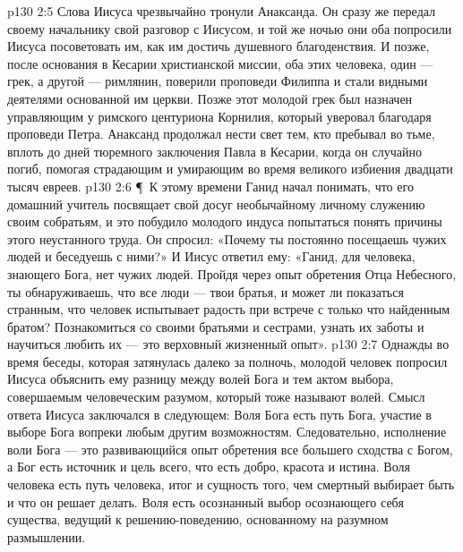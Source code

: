\vs p130 2:5 Слова Иисуса чрезвычайно тронули Анаксанда. Он сразу же передал своему начальнику свой разговор с Иисусом, и той же ночью они оба попросили Иисуса посоветовать им, как им достичь душевного благоденствия. И позже, после основания в Кесарии христианской миссии, оба этих человека, один --- грек, а другой --- римлянин, поверили проповеди Филиппа и стали видными деятелями основанной им церкви. Позже этот молодой грек был назначен управляющим у римского центуриона Корнилия, который уверовал благодаря проповеди Петра. Анаксанд продолжал нести свет тем, кто пребывал во тьме, вплоть до дней тюремного заключения Павла в Кесарии, когда он случайно погиб, помогая страдающим и умирающим во время великого избиения двадцати тысяч евреев.
\vs p130 2:6 \P\ К этому времени Ганид начал понимать, что его домашний учитель посвящает свой досуг необычайному личному служению своим собратьям, и это побудило молодого индуса попытаться понять причины этого неустанного труда. Он спросил: «Почему ты постоянно посещаешь чужих людей и беседуешь с ними?» И Иисус ответил ему: «Ганид, для человека, знающего Бога, нет чужих людей. Пройдя через опыт обретения Отца Небесного, ты обнаруживаешь, что все люди --- твои братья, и может ли показаться странным, что человек испытывает радость при встрече с только что найденным братом? Познакомиться со своими братьями и сестрами, узнать их заботы и научиться любить их --- это верховный жизненный опыт».
\vs p130 2:7 Однажды во время беседы, которая затянулась далеко за полночь, молодой человек попросил Иисуса объяснить ему разницу между волей Бога и тем актом выбора, совершаемым человеческим разумом, который тоже называют волей. Смысл ответа Иисуса заключался в следующем: Воля Бога есть путь Бога, участие в выборе Бога вопреки любым другим возможностям. Следовательно, исполнение воли Бога --- это развивающийся опыт обретения все большего сходства с Богом, а Бог есть источник и цель всего, что есть добро, красота и истина. Воля человека есть путь человека, итог и сущность того, чем смертный выбирает быть и что он решает делать. Воля есть осознанный выбор осознающего себя существа, ведущий к решению\hyp{}поведению, основанному на разумном размышлении.
